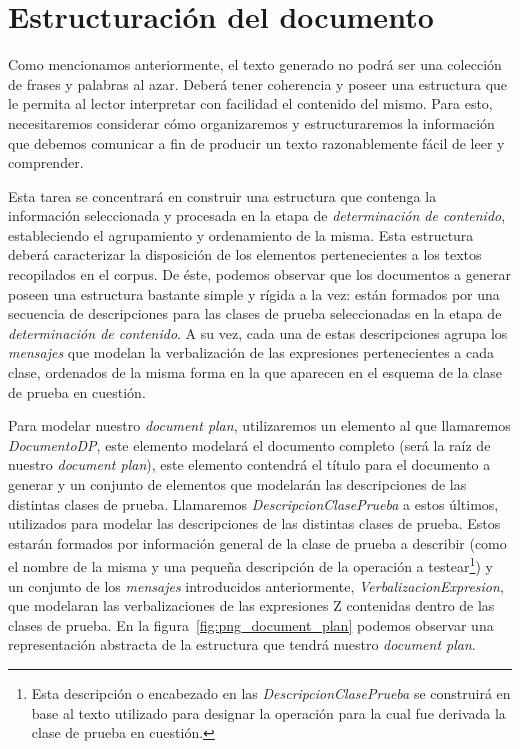 \section{Estructuración del documento}
\label{sec:document_structure}

Como mencionamos anteriormente, el texto generado no podrá ser una colección de frases y palabras al azar. Deberá tener coherencia y poseer una estructura que le permita al lector interpretar con facilidad el contenido del mismo. Para esto, necesitaremos considerar cómo organizaremos y estructuraremos la información que debemos comunicar a fin de producir un texto razonablemente fácil de leer y comprender.

Esta tarea se concentrará en construir una estructura que contenga la información seleccionada y procesada en la etapa de \emph{determinación de contenido}, estableciendo el agrupamiento y ordenamiento de la misma. Esta estructura deberá caracterizar la disposición de los elementos pertenecientes a los textos recopilados en el corpus. De éste, podemos observar que los documentos a generar poseen una estructura bastante simple y rígida a la vez: están formados por una secuencia de descripciones para las clases de prueba seleccionadas en la etapa de \emph{determinación de contenido}. A su vez, cada una de estas descripciones agrupa los \emph{mensajes} que modelan la verbalización de las expresiones pertenecientes a cada clase, ordenados de la misma forma en la que aparecen en el esquema de la clase de prueba en cuestión. 

Para modelar nuestro \emph{document plan}, utilizaremos un elemento al que llamaremos \emph{DocumentoDP}, este elemento modelará el documento completo (será la raíz de nuestro \emph{document plan}), este elemento contendrá el título para el documento a generar y un conjunto de elementos que modelarán las descripciones de las distintas clases de prueba. Llamaremos \emph{DescripcionClasePrueba} a estos últimos, utilizados para modelar las descripciones de las distintas clases de prueba. Estos estarán formados por información general de la clase de prueba a describir (como el nombre de la misma y una pequeña descripción de la operación a testear\footnote{Esta descripción o encabezado en las \emph{DescripcionClasePrueba} se construirá en base al texto utilizado para designar la operación para la cual fue derivada la clase de prueba en cuestión.}) y un conjunto de los \emph{mensajes} introducidos anteriormente, \emph{VerbalizacionExpresion}, que modelaran las verbalizaciones de las expresiones Z contenidas dentro de las clases de prueba. En la figura~\ref{fig:png_document_plan} podemos observar una representación abstracta de la estructura que tendrá nuestro \emph{document plan}.

